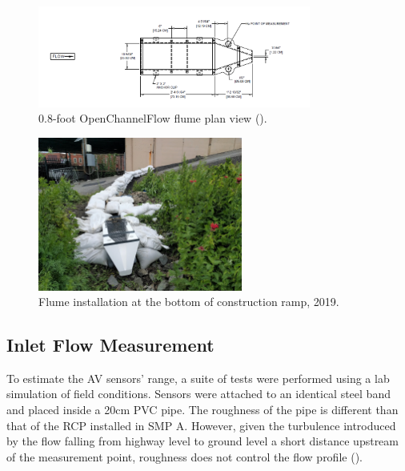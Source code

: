 \begin{figure}[ht!]
	\centering
	\includegraphics[width=0.8\textwidth]{gfx/chapter-instrumentation/h-flume-plan-view.png}
	\caption[0.8-foot OpenChannelFlow flume plan view.]{0.8-foot OpenChannelFlow flume plan view (\cite{OpenChannelFlow2021}).}
	\label{fig:flume-drawing}
\end{figure}
\begin{figure}[ht!]
	\centering
	\includegraphics[width=0.6\textwidth]{gfx/chapter-instrumentation/flume-install.jpg}
	\caption{Flume installation at the bottom of construction ramp, 2019.}
	\label{fig:flume-site-1}
\end{figure}

\subsection{Inlet Flow Measurement}

To estimate the AV sensors' range, a suite of tests were performed using a lab simulation of field conditions.
Sensors were attached to an identical steel band and placed inside a 20cm PVC pipe.
The roughness of the pipe is different than that of the RCP installed in SMP A.
However, given the turbulence introduced by the flow falling from highway level to ground level a short distance upstream of the measurement point, roughness does not control the flow profile (\cite{mays2010water}).

